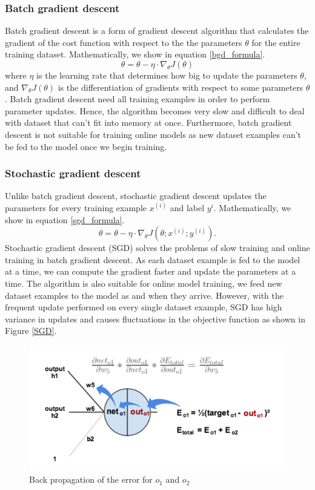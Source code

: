 \documentclass[master]{thesis-uestc}
\begin{document}
\subsubsection{Batch gradient descent}
Batch gradient descent is a form of gradient descent algorithm that calculates the gradient of the cost function with respect to the the parameters $\theta$ for the entire training dataset. Mathematically, we show in equation \ref{bgd_formula}.
\begin{equation}
    \theta = \theta - \eta \cdot \nabla_\theta J(\theta)
\label{bgd_formula}
\end{equation}
where $\eta$ is the learning rate that determines how big to update the parameters $\theta$, and $\nabla_\theta J(\theta)$ is the differentiation of gradients with respect to some parameters $\theta$. Batch gradient descent need all training examples in order to perform parameter updates. Hence, the algorithm becomes very slow and difficult to deal with dataset that can't fit into memory at once. Furthermore, batch gradient descent is not suitable for training online models as new dataset examples can't be fed to the model once we begin training. 

\subsubsection{Stochastic gradient descent}
Unlike batch gradient descent, stochastic gradient descent updates the parameters for every training example $x^{(i)}$ and label $y^{i}$. Mathematically, we show in equation \ref{sgd_formula}.
\begin{equation}
    \theta = \theta - \eta \cdot\nabla_\theta J(\theta;x^{(i)};y^{(i)}).
\label{sgd_formula}
\end{equation}
Stochastic gradient descent (SGD) solves the problems of slow training and online training in batch gradient descent. As each dataset example is fed to the model at a time, we can compute the gradient faster and update the parameters at a time. The algorithm is also suitable for online model training, we feed new dataset examples to the model as and when they arrive. However, with the frequent update performed on every single dataset example, SGD has high variance in updates and causes fluctuations in the objective function as shown in Figure \ref{SGD}.

\begin{figure}[ht]
\includegraphics[width=5in]{pic/output_1_backprop-4.png}
\caption{Back propagation of the error for $o_1$ and $o_2$}
\label{output_1_backprop}
\end{figure}
\end{document}
